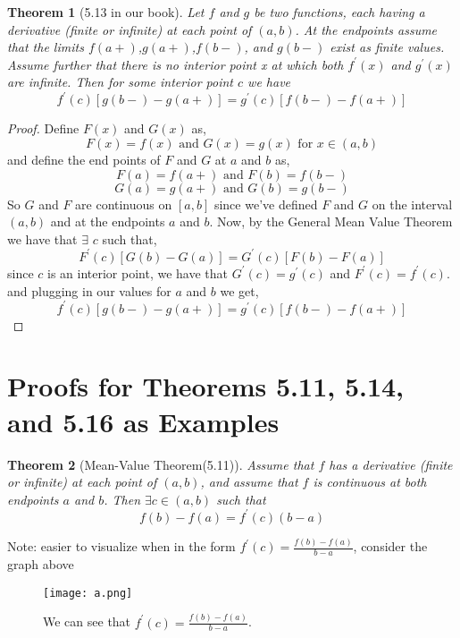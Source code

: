 \documentclass[aps,pra,notitlepage,amsmath,amssymb,letterpaper,12pt]{revtex4-1}
\newtheorem{theorem}{Theorem}
\begin{document}
\begin{theorem}[5.13 in our book]
Let $f$ and $g$ be two functions, each having a derivative (finite or infinite) at each point of $(a,b)$. At the endpoints assume that the limits $f(a+)$,$g(a+)$,$f(b-)$, and $g(b-)$ exist as finite values. Assume further that there is no interior point x at which both $f^\prime(x)$ and $g^\prime(x)$ are infinite. Then for some
interior point $c$ we have
\[f^\prime(c)[g(b-)-g(a+)] = g^\prime(c)[f(b-)-f(a+)]\]
\end{theorem}

\begin{proof}
Define $F(x)$ and $G(x)$ as, $$F(x) = f(x) \textrm{ and } G(x) = g(x) \textrm{ for } x \in (a,b)$$
and define the end points of $F$ and $G$ at $a$ and $b$ as,
$$F(a) = f(a+)\textrm{ and } F(b) = f(b-)$$
$$G(a) = g(a+)\textrm{ and } G(b) = g(b-)$$
So $G$ and $F$ are continuous on $[a,b]$ since we've defined $F$ and $G$ on the interval $(a,b)$ and at the endpoints $a$ and $b$. Now, by the General Mean Value Theorem we have that $\exists$ $c$ such that,
\[F^\prime(c)[G(b)-G(a)] = G^\prime(c)[F(b)-F(a)]\]
since $c$ is an interior point, we have that $G^\prime(c) = g^\prime(c)$ and $F^\prime(c) = f^\prime(c)$. and plugging in our values for $a$ and $b$ we get,
\[f^\prime(c)[g(b-)-g(a+)] = g^\prime(c)[f(b-)-f(a+)]\]
\end{proof}

\section{Proofs for Theorems 5.11, 5.14, and 5.16 as Examples}

\begin{theorem}[Mean-Value Theorem(5.11)]
Assume that $f$ has a derivative (finite or infinite) at each point of $(a,b)$, and assume that $f$ is continuous at both endpoints $a$ and $b$. Then $\exists c \in (a,b)$ such that
\[f(b) - f(a) = f^\prime(c)(b-a)\]
\end{theorem}

Note: easier to visualize when in the form $f^\prime(c) = \frac{f(b)-f(a)}{b-a}$, consider the graph above

\begin{figure}[h!] %
  \texttt{[image: a.png]}  %
  \caption{We can see that $f^\prime(c) = \frac{f(b)-f(a)}{b-a}$.}
  \label{fig:figlabel}
\end{figure}
\end{document}
